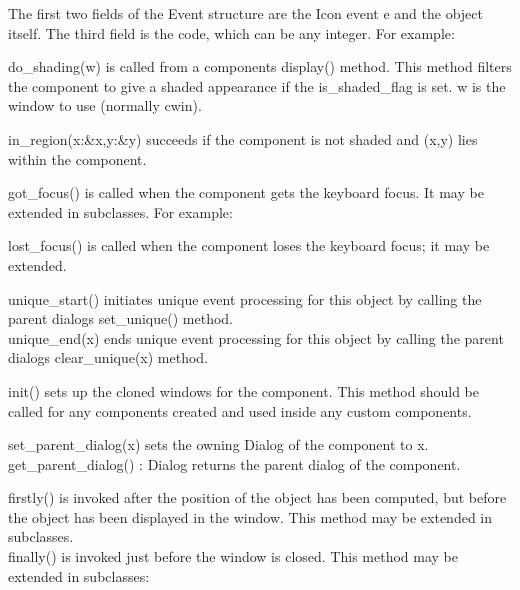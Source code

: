 The first two fields of the Event structure are the Icon event e and the
object itself. The third field is the code, which can be any integer.
For example:


do\_shading(w) is called from a component{\textquotesingle}s display()
method. This method filters the component to give a shaded appearance
if the is\_shaded\_flag is set. w is the window to use (normally cwin).

in\_region(x:\&x,y:\&y) succeeds if the component is not shaded and
(x,y) lies within the component.

got\_focus() is called when the component gets the keyboard focus. It
may be extended in subclasses. For example:


lost\_focus() is called when the component loses the keyboard focus; it
may be extended.

unique\_start() initiates unique event processing for this object by
calling the parent dialog{\textquotesingle}s set\_unique()
method.\\
unique\_end(x) ends unique event processing for this object by calling
the parent dialog{\textquotesingle}s clear\_unique(x) method.

init() sets up the cloned windows for the component. This method should
be called for any components created and used inside any custom
components.

set\_parent\_dialog(x) sets the owning Dialog of the component to
x.\\
get\_parent\_dialog() : Dialog returns the parent dialog of the
component.

firstly() is invoked after the position of the object has been computed,
but before the object has been displayed in the window. This method may
be extended in subclasses.\\
finally() is invoked just before the window is closed. This method may
be extended in subclasses:


